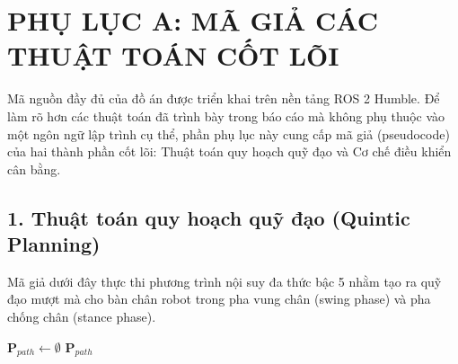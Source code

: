 \chapter*{PHỤ LỤC A: MÃ GIẢ CÁC THUẬT TOÁN CỐT LÕI}

Mã nguồn đầy đủ của đồ án được triển khai trên nền tảng ROS 2 Humble. Để làm rõ hơn các thuật toán đã trình bày trong báo cáo mà không phụ thuộc vào một ngôn ngữ lập trình cụ thể, phần phụ lục này cung cấp mã giả (pseudocode) của hai thành phần cốt lõi: Thuật toán quy hoạch quỹ đạo và Cơ chế điều khiển cân bằng.

\section*{1. Thuật toán quy hoạch quỹ đạo (Quintic Planning)}

Mã giả dưới đây thực thi phương trình nội suy đa thức bậc 5 nhằm tạo ra quỹ đạo mượt mà cho bàn chân robot trong pha vung chân (swing phase) và pha chống chân (stance phase).

\begin{algorithm}[H]
\caption{Quintic Polynomial Trajectory Planning}
\SetAlgoLined
{}
$\mathbf{P}_{path} \leftarrow \emptyset$\;
\Return $\mathbf{P}_{path}$\;
\end{algorithm}

